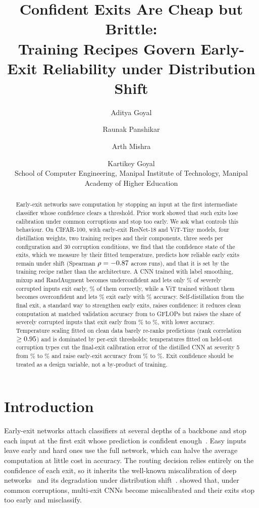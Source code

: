 \documentclass[10pt]{article}
\title{Confident Exits Are Cheap but Brittle:\\ Training Recipes Govern Early-Exit Reliability under Distribution Shift}
\author{Aditya Goyal \and Raunak Panshikar \and Arth Mishra \and Kartikey Goyal\\
\small School of Computer Engineering, Manipal Institute of Technology, Manipal Academy of Higher Education}
\date{}
\begin{document}
\maketitle

\begin{abstract}
Early-exit networks save computation by stopping an input at the first intermediate classifier whose confidence
clears a threshold. Prior work showed that such exits lose calibration under common corruptions and stop too
early. We ask what controls this behaviour. On CIFAR-100, with early-exit ResNet-18 and ViT-Tiny models, four
distillation weights, two training recipes and their components, three seeds per configuration and 30 corruption
conditions, we find that the confidence state of the exits, which we measure by their fitted temperature, predicts
how reliable early exits remain under shift (Spearman $\rho=-0.87$ across \nruns{} runs), and that it is set by
the training recipe rather than the architecture. A CNN trained with label smoothing, mixup and RandAugment becomes
underconfident and lets only \cnnstrongearly\% of severely corrupted inputs exit early, \cnnstrongprec\% of them
correctly, while a ViT trained without them becomes overconfident and lets \vitplainearly\% exit early with
\vitplainprec\% accuracy. Self-distillation from the final exit, a standard way to strengthen early exits, raises
confidence: it reduces clean computation at matched validation accuracy from \cnncecost{} to \cnnkdcost{} GFLOPs but
raises the share of severely corrupted inputs that exit early from \cnnceearly\% to \cnnkdearly\%, with lower
accuracy. Temperature scaling fitted on clean data barely re-ranks predictions (rank correlation $\geq0.95$)
and is dominated by per-exit thresholds; temperatures fitted on held-out corruption types cut the final-exit
calibration error of the distilled CNN at severity 5 from \cnnkdecets\% to \cnnkdeceloco\% and raise early-exit
accuracy from \cnnkdprects\% to \cnnkdprecloco\%. Exit confidence should be treated as a design variable, not a
by-product of training.
\end{abstract}

\section{Introduction}
Early-exit networks attach classifiers at several depths of a backbone and stop each input at the first exit whose
prediction is confident enough~\citep{teerapittayanon2016branchynet,huang2018msdnet,kaya2019sdn}. Easy inputs leave
early and hard ones use the full network, which can halve the average computation at little cost in accuracy. The
routing decision relies entirely on the confidence of each exit, so it inherits the well-known miscalibration of
deep networks~\citep{guo2017calibration} and its degradation under distribution
shift~\citep{ovadia2019trust,hendrycks2019benchmarking}. \citet{mehra2022robustness} showed that, under common
corruptions, multi-exit CNNs become miscalibrated and their exits stop too early and misclassify.
\end{document}
